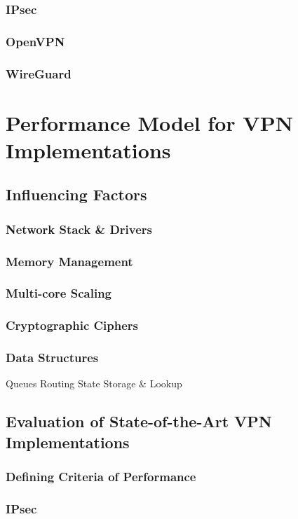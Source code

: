 \documentclass[IN,11pt,twoside,openright,master,english]{tumthesis}
\begin{document}
	\subsection{IPsec}
	\cite{ferguson1999cryptographic}
	\subsection{OpenVPN}
	
	\subsection{WireGuard}
	\cite{donenfeld2017wireguard}
	\cite{dowling2018cryptographic}
	

\chapter{Performance Model for VPN Implementations}
\section{Influencing Factors}
	\subsection{Network Stack \& Drivers}
	\subsection{Memory Management}
	\subsection{Multi-core Scaling}
	\subsection{Cryptographic Ciphers}
	\subsection{Data Structures}
		Queues
		Routing
		State Storage \& Lookup
\section{Evaluation of State-of-the-Art VPN Implementations}
	\subsection{Defining Criteria of Performance}
	\subsection{IPsec}
\end{document}
